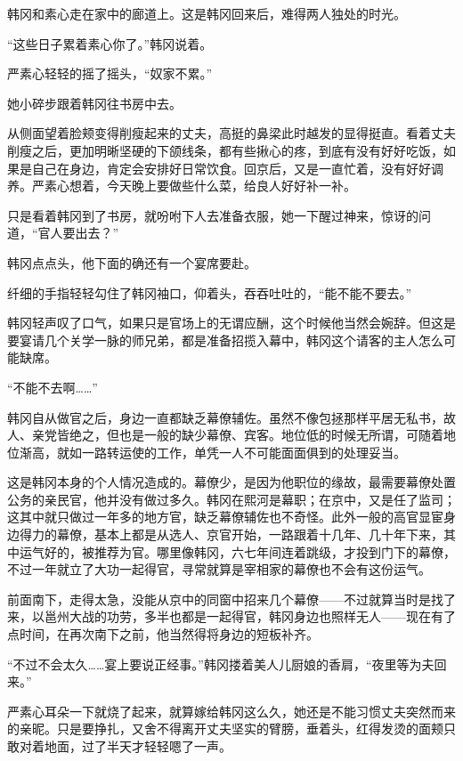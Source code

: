 韩冈和素心走在家中的廊道上。这是韩冈回来后，难得两人独处的时光。

“这些日子累着素心你了。”韩冈说着。

严素心轻轻的摇了摇头，“奴家不累。”

她小碎步跟着韩冈往书房中去。

从侧面望着脸颊变得削瘦起来的丈夫，高挺的鼻梁此时越发的显得挺直。看着丈夫削瘦之后，更加明晰坚硬的下颌线条，都有些揪心的疼，到底有没有好好吃饭，如果是自己在身边，肯定会安排好日常饮食。回京后，又是一直忙着，没有好好调养。严素心想着，今天晚上要做些什么菜，给良人好好补一补。

只是看着韩冈到了书房，就吩咐下人去准备衣服，她一下醒过神来，惊讶的问道，“官人要出去？”

韩冈点点头，他下面的确还有一个宴席要赴。

纤细的手指轻轻勾住了韩冈袖口，仰着头，吞吞吐吐的，“能不能不要去。”

韩冈轻声叹了口气，如果只是官场上的无谓应酬，这个时候他当然会婉辞。但这是要宴请几个关学一脉的师兄弟，都是准备招揽入幕中，韩冈这个请客的主人怎么可能缺席。

“不能不去啊……”

韩冈自从做官之后，身边一直都缺乏幕僚辅佐。虽然不像包拯那样平居无私书，故人、亲党皆绝之，但也是一般的缺少幕僚、宾客。地位低的时候无所谓，可随着地位渐高，就如一路转运使的工作，单凭一人不可能面面俱到的处理妥当。

这是韩冈本身的个人情况造成的。幕僚少，是因为他职位的缘故，最需要幕僚处置公务的亲民官，他并没有做过多久。韩冈在熙河是幕职；在京中，又是任了监司；这其中就只做过一年多的地方官，缺乏幕僚辅佐也不奇怪。此外一般的高官显宦身边得力的幕僚，基本上都是从选人、京官开始，一路跟着十几年、几十年下来，其中运气好的，被推荐为官。哪里像韩冈，六七年间连着跳级，才投到门下的幕僚，不过一年就立了大功一起得官，寻常就算是宰相家的幕僚也不会有这份运气。

前面南下，走得太急，没能从京中的同窗中招来几个幕僚——不过就算当时是找了来，以邕州大战的功劳，多半也都是一起得官，韩冈身边也照样无人——现在有了点时间，在再次南下之前，他当然得将身边的短板补齐。

“不过不会太久……宴上要说正经事。”韩冈搂着美人儿厨娘的香肩，“夜里等为夫回来。”

严素心耳朵一下就烧了起来，就算嫁给韩冈这么久，她还是不能习惯丈夫突然而来的亲昵。只是要挣扎，又舍不得离开丈夫坚实的臂膀，垂着头，红得发烫的面颊只敢对着地面，过了半天才轻轻嗯了一声。

